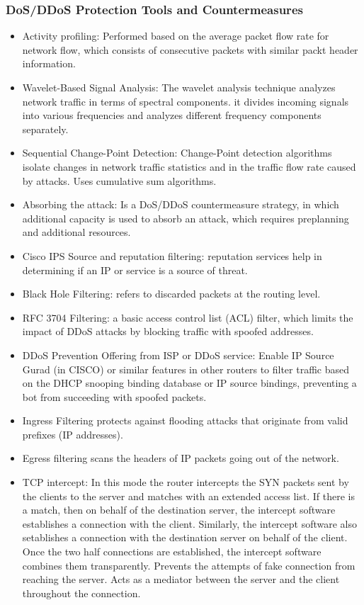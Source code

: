\subsubsection{DoS/DDoS Protection Tools and Countermeasures}
\begin{itemize}
    \item Activity profiling: Performed based on the average packet flow rate for network flow, which consists of consecutive packets with similar packt header information.
    \item Wavelet-Based Signal Analysis: The wavelet analysis technique analyzes network traffic in terms of spectral components. it divides incoming signals into various frequencies and analyzes different frequency components separately.
    \item Sequential Change-Point Detection: Change-Point detection algorithms isolate changes in network traffic statistics and in the traffic flow rate caused by attacks. Uses cumulative sum algorithms.
    \item Absorbing the attack: Is a DoS/DDoS countermeasure strategy, in which additional capacity is used to absorb an attack, which requires preplanning and additional resources.
    \item Cisco IPS Source and reputation filtering: reputation services help in determining if an IP or service is a source of threat.
    \item Black Hole Filtering: refers to discarded packets at the routing level.
    \item RFC 3704 Filtering: a basic access control list (ACL) filter, which limits the impact of DDoS attacks by blocking traffic with spoofed addresses.
    \item DDoS Prevention Offering from ISP or DDoS service: Enable IP Source Gurad (in CISCO) or similar features in other routers to filter traffic based on the DHCP snooping binding database or IP source bindings, preventing a bot from succeeding with spoofed packets.
    \item Ingress Filtering protects against flooding attacks that originate from valid prefixes (IP addresses).
    \item Egress filtering scans the headers of IP packets going out of the network.
    \item TCP intercept: In this mode the router intercepts the SYN packets sent by the clients to the server and matches with an extended access list. If there is a match, then on behalf of the destination server, the intercept software establishes a connection with the client. Similarly, the intercept software also setablishes a connection with the destination server on behalf of the client. Once the two half connections are established, the intercept software combines them transparently. Prevents the attempts of fake connection from reaching the server. Acts as a mediator between the server and the client throughout the connection.

\end{itemize}
